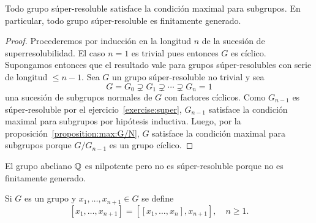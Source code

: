 \begin{proposition}
	\label{proposition:superfg}
	Todo grupo súper-resoluble satisface la condición maximal para subgrupos. En
	particular, todo grupo súper-resoluble es finitamente generado.
\end{proposition}

\begin{proof}
	Procederemos por inducción en la longitud $n$ de la sucesión de
	superresolubilidad.  El caso $n=1$ es trivial pues entonces $G$ es cíclico.
	Supongamos entonces que el resultado vale para grupos súper-resolubles con
	serie de longitud $\leq n-1$.  Sea $G$ un grupo súper-resoluble no trivial y sea 
	\[
	G=G_0\supsetneq
	G_1\supsetneq\cdots\supsetneq G_n=1
	\]
	una sucesión de subgrupos normales de $G$ con factores cíclicos. Como
	$G_{n-1}$ es súper-resoluble por el ejercicio~\ref{exercise:super},
	$G_{n-1}$ satisface la condición maximal para subgrupos por hipótesis
	inductiva.  Luego, por la proposición~\ref{proposition:max:G/N}, $G$ satisface la condición maximal para subgrupos porque
	$G/G_{n-1}$ es un grupo cíclico.
\end{proof}

%

\begin{example}
	El grupo abeliano $\mathbb{Q}$ es nilpotente pero no es súper-resoluble
	porque no es finitamente generado.
\end{example}


Si $G$ es un grupo y $x_1,\dots,x_{n+1}\in G$ se define 
\[
[x_1,\dots,x_{n+1}]=\left[ [x_1,\dots,x_n],x_{n+1} \right],\quad
n\geq1.
\]

